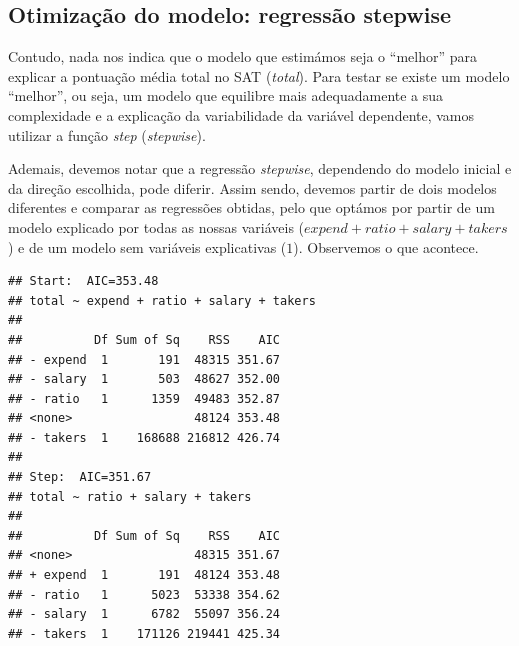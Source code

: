 \documentclass[]{article}
\begin{document}
\subsection{Otimização do modelo: regressão stepwise}

Contudo, nada nos indica que o modelo que estimámos seja o ``melhor''
para explicar a pontuação média total no SAT (\emph{total}). Para testar
se existe um modelo ``melhor'', ou seja, um modelo que equilibre mais
adequadamente a sua complexidade e a explicação da variabilidade da
variável dependente, vamos utilizar a função \emph{step}
(\emph{stepwise}).

Ademais, devemos notar que a regressão \emph{stepwise}, dependendo do
modelo inicial e da direção escolhida, pode diferir. Assim sendo,
devemos partir de dois modelos diferentes e comparar as regressões
obtidas, pelo que optámos por partir de um modelo explicado por todas as
nossas variáveis (\(expend + ratio + salary + takers\)) e de um modelo
sem variáveis explicativas (\(1\)). Observemos o que acontece.

\begin{Shaded}
\begin{Highlighting}[]
\OtherTok{\textless{}{-}} \SpecialCharTok{\textasciitilde{}} \NormalTok{, }
\OtherTok{\textless{}{-}}

\OtherTok{\textless{}{-}}  \NormalTok{)}
\end{Highlighting}
\end{Shaded}

\begin{verbatim}
## Start:  AIC=353.48
## total ~ expend + ratio + salary + takers
## 
##          Df Sum of Sq    RSS    AIC
## - expend  1       191  48315 351.67
## - salary  1       503  48627 352.00
## - ratio   1      1359  49483 352.87
## <none>                 48124 353.48
## - takers  1    168688 216812 426.74
## 
## Step:  AIC=351.67
## total ~ ratio + salary + takers
## 
##          Df Sum of Sq    RSS    AIC
## <none>                 48315 351.67
## + expend  1       191  48124 353.48
## - ratio   1      5023  53338 354.62
## - salary  1      6782  55097 356.24
## - takers  1    171126 219441 425.34
\end{verbatim}
\end{document}
